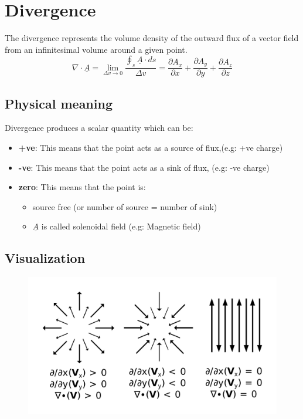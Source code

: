 \documentclass[12 pt]{article}
\begin{document}
\section{Divergence}
The divergence represents the volume density of the outward flux of a vector field from an infinitesimal volume around a given point. 
$$
\nabla\cdot\underline{A}=\lim_{\Delta v \to 0} \frac{\oint_{s}\underline{A}\cdot ds}{\Delta v}=\frac{\partial{A_x}}{\partial{x}}+\frac{\partial{A_y}}{\partial{y}}+\frac{\partial{A_z}}{\partial{z}}
$$
\subsection{Physical meaning}
Divergence produces a scalar quantity which can be:
\begin{itemize}
    \item \textbf{+ve}: This means that the point acts as a source of flux,(e.g: +ve charge)
    \item \textbf{-ve}: This means that the point acts as a sink of flux, (e.g: -ve charge)
    \item \textbf{zero}: This means that the point is:\begin{itemize}
        \item source free (or number of source = number of sink)
        \item $\underline{A}$ is called solenoidal field (e.g: Magnetic field)
    \end{itemize}
\end{itemize}
\subsection{Visualization}
    \begin{figure}[H]
    \centering
    \includegraphics[scale=0.15]{./images/divergence}
    \label{divergence} 
\end{figure}
\newpage
\end{document}
